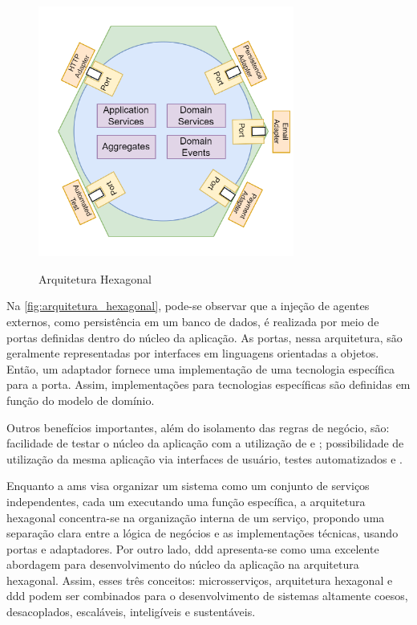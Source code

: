 \begin{figure}[!ht]
    \centering
    \caption{Arquitetura Hexagonal}
    \includegraphics[width=0.75\textwidth]{media/hexagonal_architecture.png}
    \label{fig:arquitetura_hexagonal}
\end{figure}

Na \autoref{fig:arquitetura_hexagonal}, pode-se observar que a injeção de agentes externos, como persistência em um banco de dados, é realizada por meio de portas definidas dentro do núcleo da aplicação. As portas, nessa arquitetura, são geralmente representadas por interfaces em linguagens orientadas a objetos. Então, um adaptador fornece uma implementação de uma tecnologia específica para a porta. Assim, implementações para tecnologias específicas são definidas em função do modelo de domínio.

Outros benefícios importantes, além do isolamento das regras de negócio, são: facilidade de testar o núcleo da aplicação com a utilização de  e ; possibilidade de utilização da mesma aplicação via interfaces de usuário, testes automatizados e .

Enquanto a \acrshort{ams} visa organizar um sistema como um conjunto de serviços independentes, cada um executando uma função específica, a arquitetura hexagonal concentra-se na organização interna de um serviço, propondo uma separação clara entre a lógica de negócios e as implementações técnicas, usando portas e adaptadores. Por outro lado, \acrshort{ddd} apresenta-se como uma excelente abordagem para desenvolvimento do núcleo da aplicação na arquitetura hexagonal. Assim, esses três conceitos: microsserviços, arquitetura hexagonal e \acrshort{ddd} podem ser combinados para o desenvolvimento de sistemas altamente coesos, desacoplados, escaláveis, inteligíveis e sustentáveis.




